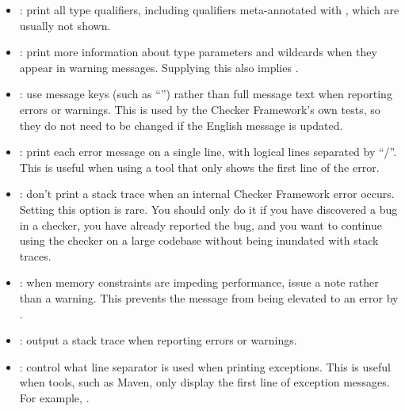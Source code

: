 \begin{itemize}
\item {}: print all type qualifiers, including
qualifiers meta-annotated with
, which are
usually not shown.

\item {}: print more information about type
  parameters and wildcards when they appear in warning messages.  Supplying
  this also implies .

\item {}: use message keys (such as ``'')
rather than full message text when reporting errors or warnings.  This is
used by the Checker Framework's own tests, so they do not need to be
changed if the English message is updated.

\item {}: print each error message on a single line, with
logical lines separated by ``/''.  This is useful when using a tool that
only shows the first line of the error.

\item {}: don't print a stack trace when an
internal Checker Framework error occurs.  Setting this option is rare.  You
should only do it if you have discovered a bug in a checker, you have
already reported the bug, and you want to continue using the checker on a
large codebase without being inundated with stack traces.

\item {}: when memory constraints are
impeding performance, issue a note rather than a warning.
This prevents the message from being elevated to an error by .

\item {}: output a stack trace when reporting errors or warnings.

\item {}: control what line separator is used when printing exceptions.
This is useful when tools, such as Maven, only display the first line of exception messages. For
example, .

\end{itemize}



